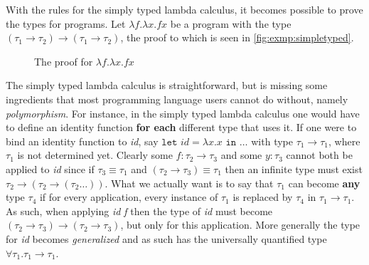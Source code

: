\documentclass[11pt,oneside,a4paper]{report}
\begin{document}
\begin{exmp}
  With the rules for the simply typed lambda calculus, it becomes possible to prove the types for programs.
  Let $\lambda f.\lambda x.f x$ be a program with the type $(\tau_1 \rightarrow \tau_2) \rightarrow (\tau_1 \rightarrow \tau_2)$, the proof to which is seen in \autoref{fig:exmp:simpletyped}.
  \begin{figure}[ht]
    \begin{mdframed}[style=bigbox]
      \begin{prooftree}
      \end{prooftree}
    \end{mdframed}
    \caption{The proof for $\lambda f. \lambda x . fx$}
    \label{fig:exmp:simpletyped}
  \end{figure}
\end{exmp}

The simply typed lambda calculus is straightforward, but is missing some ingredients that most programming language users cannot do without, namely \textit{polymorphism}.
For instance, in the simply typed lambda calculus one would have to define an identity function \textbf{for each} different type that uses it.
If one were to bind an identity function to \textit{id}, say $\texttt{let } \textit{id} = \lambda x. x \texttt{ in } \dots$ with type $\tau_1 \rightarrow \tau_1$, where $\tau_1$ is not determined yet.
Clearly some $f: \tau_2 \rightarrow \tau_3$ and some $y: \tau_3$ cannot both be applied to \textit{id} since if $\tau_3 \equiv \tau_1$ and $(\tau_2 \rightarrow \tau_3) \equiv \tau_1$ then an infinite type must exist $\tau_2 \rightarrow (\tau_2 \rightarrow (\tau_2 \dots))$.
What we actually want is to say that $\tau_1$ can become \textbf{any} type $\tau_4$ if for every application, every instance of $\tau_1$ is replaced by $\tau_4$ in $\tau_1 \rightarrow \tau_1$.
As such, when applying \textit{id f} then the type of \textit{id} must become $(\tau_2 \rightarrow \tau_3) \rightarrow (\tau_2 \rightarrow \tau_3)$, but only for this application.
More generally the type for \textit{id} becomes \textit{generalized} and as such has the universally quantified type $\forall \tau_1. \tau_1 \rightarrow \tau_1$.
\end{document}
